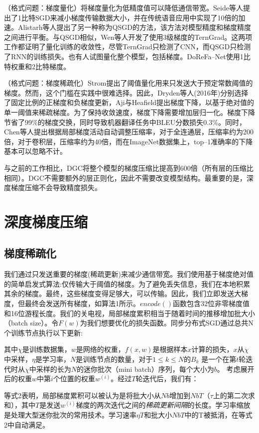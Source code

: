 （格式问题：梯度量化）将梯度量化为低精度值可以降低通信带宽。Seide等人提出了1比特SGD来减小梯度传输数据大小，并在传统语音应用中实现了10倍的加速。Alistarh等人提出了另一种称为QSGD的方法，该方法对模型精度和梯度精度之间进行平衡。与QSGD相似，Wen等人开发了使用3级梯度的TernGrad。这两项工作都证明了量化训练的收敛性，尽管TernGrad只检测了CNN，而QSGD只检测了RNN的训练损失。也有人试图量化整个模型，包括梯度。DoReFa--Net使用1比特权重和2比特梯度。

（格式问题：梯度稀疏化）Strom提出了阈值量化用来只发送大于预定常数阈值的梯度。然而，这个门槛在实践中很难选择。因此，Dryden等人(2016年)分别选择了固定比例的正梯度和负梯度更新，Aji与Heafield提出梯度下降，以基于绝对值的单一阈值来稀疏梯度。为了保持收敛速度，梯度下降需要增加层归一化。梯度下降节省了99\%的梯度交换，同时导致机器翻译任务中BLEU分数损失0.3\%。同时，Chen等人提出根据局部梯度活动自动调整压缩率，对于全连通层，压缩率约为200倍，对于卷积层，压缩率约为40倍，而在ImageNet数据集上，top--1准确率的下降基本可以忽略不计。

与之前的工作相比，DGC将整个模型的梯度压缩比提高到600倍（所有层的压缩比相同）。DGC不需要额外的层正则化，因此不需要改变模型结构。最重要的是，深度梯度压缩不会导致精度损失。

\section{深度梯度压缩}

\subsection{梯度稀疏化}
我们通过只发送重要的梯度(稀疏更新)来减少通信带宽。我们使用基于梯度绝对值的简单启发式算法:仅传输大于阈值的梯度。为了避免丢失信息，我们在本地积累其余的梯度。最终，这些梯度变得足够大，可以传输。因此，我们立即发送大梯度，但最终会发送所有梯度，如算法1所示。$encode()$函数包含32位非零梯度值和16位游程长度。我们的关电视，局部梯度累积相当于随着时间的推移增加批大小（batch size）。令$F(w)$为我们想要优化的损失函数。同步分布式SGD通过总共N个训练节点执行以下更新:

其中$\chi$是训练数据集，$w$是网络的权重，$f(x,w)$是根据样本$x$计算的损失，$x$从$\chi$中采样，$\eta$是学习率，$N$是训练节点的数量，对于$1 \leq k \le N$的$B_k$ 是一个在第$t$轮迭代时从$\chi$中采样的长为$N$的迷你批次（mini batch）序列，每个大小为$b$。
考虑展开后的权重$w$中第$i$个位置的权重$w^{(i)}$。经过$T$轮迭代后，我们有：

等式2表明，局部梯度累积可以被认为是将批大小从$Nb$增加到$NbT$（$\tau$上的第二次求和），其中$T$是发送$w^{(i)}$梯度的两次迭代之间的\textit{稀疏更新间隔}的长度。学习率缩放是处理大型迷你批次的常用技术。学习速率$\eta T$和批大小$NbT$中的T被抵消，在等式2中自动满足。

